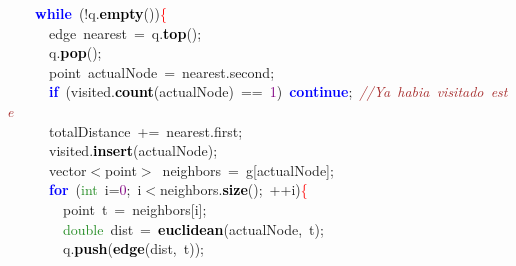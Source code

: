 \mbox{}\ \ \ \ \textbf{\textcolor{Blue}{while}}\ \textcolor{BrickRed}{(!}q\textcolor{BrickRed}{.}\textbf{\textcolor{Black}{empty}}\textcolor{BrickRed}{())}\textcolor{Red}{\{} \\
\mbox{}\ \ \ \ \ \ edge\ nearest\ \textcolor{BrickRed}{=}\ q\textcolor{BrickRed}{.}\textbf{\textcolor{Black}{top}}\textcolor{BrickRed}{();} \\
\mbox{}\ \ \ \ \ \ q\textcolor{BrickRed}{.}\textbf{\textcolor{Black}{pop}}\textcolor{BrickRed}{();} \\
\mbox{}\ \ \ \ \ \ point\ actualNode\ \textcolor{BrickRed}{=}\ nearest\textcolor{BrickRed}{.}second\textcolor{BrickRed}{;} \\
\mbox{}\ \ \ \ \ \ \textbf{\textcolor{Blue}{if}}\ \textcolor{BrickRed}{(}visited\textcolor{BrickRed}{.}\textbf{\textcolor{Black}{count}}\textcolor{BrickRed}{(}actualNode\textcolor{BrickRed}{)}\ \textcolor{BrickRed}{==}\ \textcolor{Purple}{1}\textcolor{BrickRed}{)}\ \textbf{\textcolor{Blue}{continue}}\textcolor{BrickRed}{;}\ \textit{\textcolor{Brown}{//Ya\ habia\ visitado\ este}} \\
\mbox{}\ \ \ \ \ \ totalDistance\ \textcolor{BrickRed}{+=}\ nearest\textcolor{BrickRed}{.}first\textcolor{BrickRed}{;} \\
\mbox{}\ \ \ \ \ \ visited\textcolor{BrickRed}{.}\textbf{\textcolor{Black}{insert}}\textcolor{BrickRed}{(}actualNode\textcolor{BrickRed}{);} \\
\mbox{}\ \ \ \ \ \ vector\textcolor{BrickRed}{$<$}point\textcolor{BrickRed}{$>$}\ neighbors\ \textcolor{BrickRed}{=}\ g\textcolor{BrickRed}{[}actualNode\textcolor{BrickRed}{];} \\
\mbox{}\ \ \ \ \ \ \textbf{\textcolor{Blue}{for}}\ \textcolor{BrickRed}{(}\textcolor{ForestGreen}{int}\ i\textcolor{BrickRed}{=}\textcolor{Purple}{0}\textcolor{BrickRed}{;}\ i\textcolor{BrickRed}{$<$}neighbors\textcolor{BrickRed}{.}\textbf{\textcolor{Black}{size}}\textcolor{BrickRed}{();}\ \textcolor{BrickRed}{++}i\textcolor{BrickRed}{)}\textcolor{Red}{\{} \\
\mbox{}\ \ \ \ \ \ \ \ point\ t\ \textcolor{BrickRed}{=}\ neighbors\textcolor{BrickRed}{[}i\textcolor{BrickRed}{];} \\
\mbox{}\ \ \ \ \ \ \ \ \textcolor{ForestGreen}{double}\ dist\ \textcolor{BrickRed}{=}\ \textbf{\textcolor{Black}{euclidean}}\textcolor{BrickRed}{(}actualNode\textcolor{BrickRed}{,}\ t\textcolor{BrickRed}{);} \\
\mbox{}\ \ \ \ \ \ \ \ q\textcolor{BrickRed}{.}\textbf{\textcolor{Black}{push}}\textcolor{BrickRed}{(}\textbf{\textcolor{Black}{edge}}\textcolor{BrickRed}{(}dist\textcolor{BrickRed}{,}\ t\textcolor{BrickRed}{));} \\
